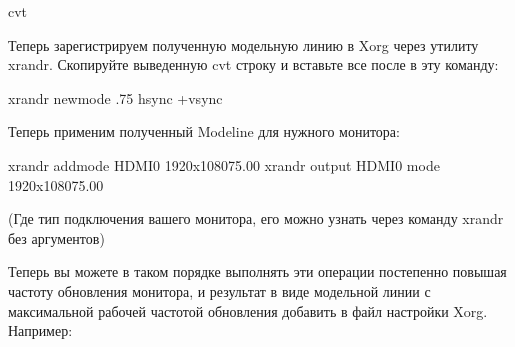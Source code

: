 \documentclass[letterpaper,10pt,russian,openany]{sphinxmanual}
\begin{document}
\begin{sphinxVerbatim}[commandchars=\\\{\}]
cvt   
\end{sphinxVerbatim}

\sphinxAtStartPar
Теперь зарегистрируем полученную модельную линию в Xorg через утилиту xrandr.
Скопируйте выведенную cvt строку и вставьте все после  в эту команду:

\begin{sphinxVerbatim}[commandchars=\\\{\}]
xrandr \PYGZhy{}\PYGZhy{}newmode   .75           \PYGZhy{}hsync +vsync
\end{sphinxVerbatim}

\sphinxAtStartPar
Теперь применим полученный Modeline для нужного монитора:

\begin{sphinxVerbatim}[commandchars=\\\{\}]
xrandr \PYGZhy{}\PYGZhy{}addmode HDMI\PYGZhy{}0 1920x1080\PYGZus{}75.00
xrandr \PYGZhy{}\PYGZhy{}output HDMI\PYGZhy{}0 \PYGZhy{}\PYGZhy{}mode 1920x1080\PYGZus{}75.00
\end{sphinxVerbatim}

\sphinxAtStartPar
(Где  \sphinxhyphen{} тип подключения вашего монитора, его можно узнать через команду xrandr без аргументов)

\sphinxAtStartPar
Теперь вы можете в таком порядке выполнять эти операции постепенно повышая частоту обновления монитора, и результат в виде
модельной линии с максимальной рабочей частотой обновления добавить в файл настройки Xorg. Например:
\end{document}
